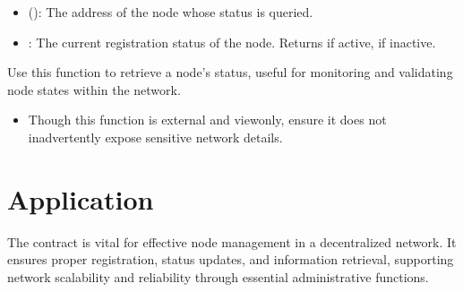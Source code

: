 \documentclass[letterpaper,10pt,english]{sphinxmanual}
\begin{document}
\sphinxAtStartPar
{}
\begin{itemize}
\item {} 
\sphinxAtStartPar
{} ():
The address of the node whose status is queried.

\end{itemize}

\sphinxAtStartPar
{}
\begin{itemize}
\item {} 
\sphinxAtStartPar
{}:
The current registration status of the node. Returns  if active,  if inactive.

\end{itemize}

\sphinxAtStartPar
{}

\sphinxAtStartPar
Use this function to retrieve a node’s status, useful for monitoring and validating node states within the network.

\sphinxAtStartPar
{}
\begin{itemize}
\item {} 
\sphinxAtStartPar
{} Though this function is external and view\sphinxhyphen{}only, ensure it does not inadvertently expose sensitive network details.

\end{itemize}


\section{Application}
\label{\detokenize{docs_node_manager_contract:application}}
\sphinxAtStartPar
The  contract is vital for effective node management in a decentralized network. It ensures proper registration, status updates, and information retrieval, supporting network scalability and reliability through essential administrative functions.
\end{document}
